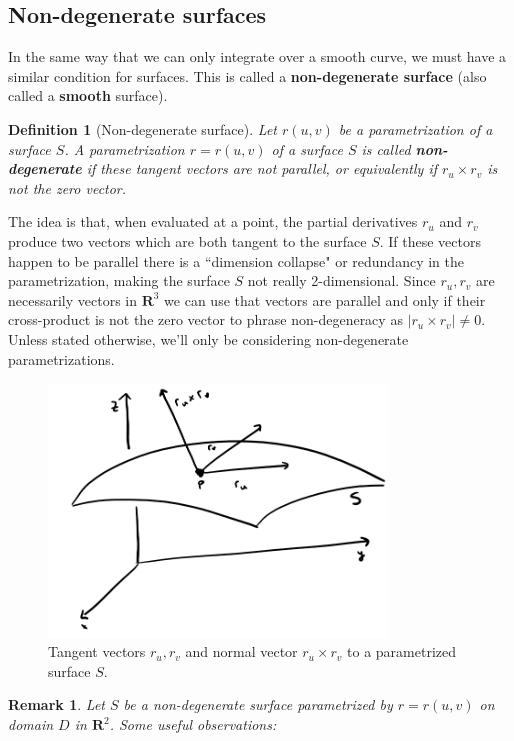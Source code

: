 \documentclass[12pt]{article}
\numberwithin{equation}{subsection}
\numberwithin{figure}{subsection}
\newtheorem{defn}[subsection]{Definition}
\theoremstyle{note}
\newtheorem{remark}[subsection]{Remark}
\begin{document}
{\subsection{Non-degenerate surfaces} In the same way that we can only integrate over a smooth curve, we must have a similar condition for surfaces. This is called a \textbf{non-degenerate surface} (also called a \textbf{smooth} surface).  

\begin{defn}[Non-degenerate surface] Let $r(u,v)$ be a parametrization of a surface $S$. A parametrization $r=r(u,v)$ of a surface $S$ is called \textbf{non-degenerate} if these tangent vectors are not parallel, or equivalently if $r_u \times r_v$ is not the zero vector. 
\end{defn}
The idea is that, when evaluated at a point, the partial derivatives $r_u$ and $r_v$ produce two vectors which are both tangent to the surface $S$. If these vectors happen to be parallel there is a ``dimension collapse" or redundancy in the parametrization, making the surface $S$ not really 2-dimensional. Since $r_u,r_v$ are necessarily vectors in $\mathbf{R}^3$ we can use that vectors are parallel and only if their cross-product is not the zero vector to phrase non-degeneracy as $|r_u \times r_v|\neq 0$. Unless stated otherwise, we'll only be considering non-degenerate parametrizations. 

\begin{figure}[h!]
\centering
\includegraphics[width=90mm]{Images/surface-normal}
\caption{Tangent vectors $r_u,r_v$ and normal vector $r_u\times r_v$ to a parametrized surface $S$.}
\label{fig-surface-normale}
\end{figure}
\begin{remark}Let $S$ be a non-degenerate surface parametrized by $r=r(u,v)$ on domain $D$ in $\mathbf{R}^2$. Some useful observations:


\end{remark}}
\end{document}
